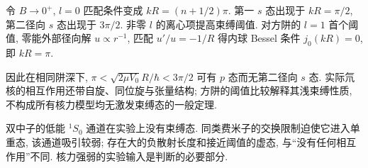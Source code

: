 令 $B\to0^+$, $l=0$ 匹配条件变成 $kR=(n+1/2)\pi$. 第一 $s$ 态出现于 $kR=\pi/2$, 第二径向 $s$ 态出现于 $3\pi/2$. 非零 $l$ 的离心项提高束缚阈值. 对方阱的 $l=1$ 首个阈值, 零能外部径向解 $u\propto r^{-1}$, 匹配 $u'/u=-1/R$ 得内球 Bessel 条件 $j_0(kR)=0$, 即 $kR=\pi$.

因此在相同阱深下, $\pi<\sqrt{2\mu V_0}R/\hbar<3\pi/2$ 可有 $p$ 态而无第二径向 $s$ 态. 实际氘核的相互作用还带自旋、同位旋与张量结构; 方阱的阈值比较解释其浅束缚性质, 不构成所有核力模型均无激发束缚态的一般定理.

双中子的低能 ${}^1S_0$ 通道在实验上没有束缚态. 同类费米子的交换限制迫使它进入单重态, 该通道吸引较弱; 存在大的负散射长度和接近阈值的虚态, 与``没有任何相互作用''不同. 核力强弱的实验输入是判断的必要部分.
